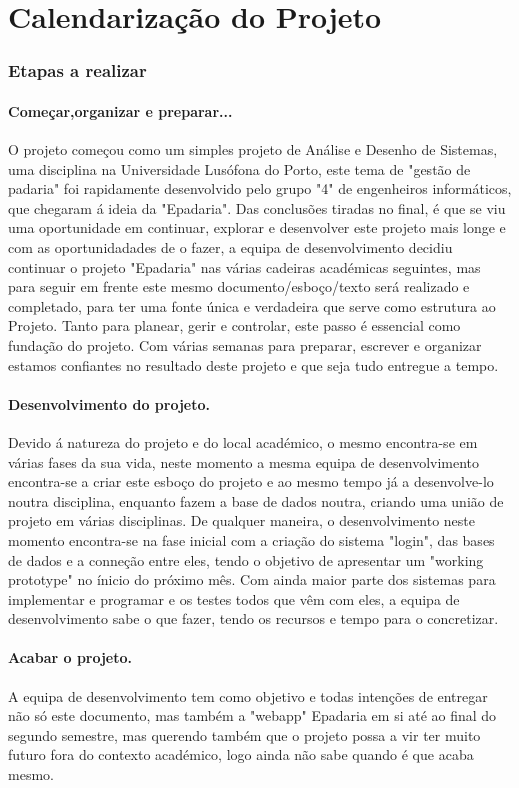 \chapter{Calendarização do Projeto}
\label{calendarizacao}
\subsection{Etapas a realizar}
\subsubsection{	Começar,organizar e preparar...}
O projeto começou como um simples projeto de Análise e Desenho de Sistemas, uma disciplina na Universidade Lusófona do Porto, este tema de "gestão de padaria" foi rapidamente desenvolvido pelo grupo "4" de engenheiros informáticos, que chegaram á ideia da "Epadaria". Das conclusões tiradas no final, é que se viu uma oportunidade em continuar, explorar e desenvolver este projeto mais longe e com as oportunidadades de o fazer, a equipa de desenvolvimento decidiu continuar o projeto "Epadaria" nas várias cadeiras académicas seguintes, mas para seguir em frente este mesmo documento/esboço/texto será realizado e completado, para ter uma fonte única e verdadeira que serve como estrutura ao Projeto. Tanto para planear, gerir e controlar, este passo é essencial como fundação do projeto. Com várias semanas para preparar, escrever e organizar estamos confiantes no resultado deste projeto e que seja tudo entregue a tempo.
\subsubsection{Desenvolvimento do projeto.}
Devido á natureza do projeto e do local académico, o mesmo encontra-se em várias fases da sua vida, neste momento a mesma equipa de desenvolvimento encontra-se a criar este esboço do projeto e ao mesmo tempo já a desenvolve-lo noutra disciplina, enquanto fazem a base de dados noutra, criando uma união de projeto em várias disciplinas. De qualquer maneira, o desenvolvimento neste momento encontra-se na fase inicial com a criação do sistema "login", das bases de dados e a conneção entre eles, tendo o objetivo de apresentar um "working prototype" no ínicio do próximo mês. Com ainda maior parte dos sistemas para implementar e programar e os testes todos que vêm com eles, a equipa de desenvolvimento sabe o que fazer, tendo os recursos e tempo para o concretizar.
\subsubsection{Acabar o projeto.}
A equipa de desenvolvimento tem como objetivo e todas intenções de entregar não só este documento, mas também a "webapp" Epadaria em si até ao final do segundo semestre, mas querendo também que o projeto possa a vir ter muito futuro fora do contexto académico, logo ainda não sabe quando é que acaba mesmo.
